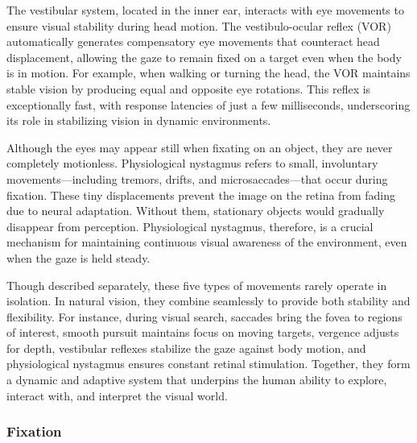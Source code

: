 \documentclass{article}
\begin{document}
The vestibular system, located in the inner ear, interacts with eye movements to ensure visual stability during head motion. 
The vestibulo-ocular reflex (VOR) automatically generates compensatory eye movements that counteract head displacement, allowing the gaze to remain fixed on a target even when the body is in motion.
For example, when walking or turning the head, the VOR maintains stable vision by producing equal and opposite eye rotations. 
This reflex is exceptionally fast, with response latencies of just a few milliseconds, underscoring its role in stabilizing vision in dynamic environments.

Although the eyes may appear still when fixating on an object, they are never completely motionless.
Physiological nystagmus refers to small, involuntary movements—including tremors, drifts, and microsaccades—that occur during fixation. 
These tiny displacements prevent the image on the retina from fading due to neural adaptation. 
Without them, stationary objects would gradually disappear from perception. Physiological nystagmus, therefore, is a crucial mechanism for maintaining continuous visual awareness of the environment, even when the gaze is held steady.

Though described separately, these five types of movements rarely operate in isolation. 
In natural vision, they combine seamlessly to provide both stability and flexibility.
For instance, during visual search, saccades bring the fovea to regions of interest, smooth pursuit maintains focus on moving targets, vergence adjusts for depth, vestibular reflexes stabilize the gaze against body motion, and physiological nystagmus ensures constant retinal stimulation.
Together, they form a dynamic and adaptive system that underpins the human ability to explore, interact with, and interpret the visual world.

\subsubsection{Fixation}
\end{document}
